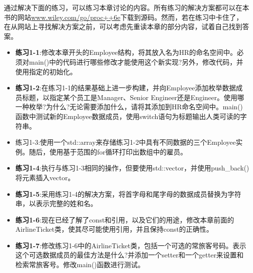 通过解决下面的练习，可以练习本章讨论的内容。所有练习的解决方案都可以在本书的网站\url{www.wiley.com/go/proc++6e}下载到源码。然而，若在练习中卡住了，在从网站上寻找解决方案之前，可以考虑先重读本章的部分内容，试着自己找到答案。

\begin{itemize}
\item
\textbf{练习1-1}:修改本章开头的Employee结构，将其放入名为HR的命名空间中。必须对main()中的代码进行哪些修改才能使用这个新实现?另外，修改代码，并使用指定的初始化。

\item
\textbf{练习1-2}:在练习1-1的结果基础上进一步构建，并向Employee添加枚举数据成员标题，以指定某个员工是Manager、Senior Engineer还是Engineer。使用哪一种枚举?为什么?无论需要添加什么，请将其添加到HR命名空间中。main()函数中测试新的Employee数据成员，使用switch语句为标题输出人类可读的字符串。

\item
练习1-3:使用一个std::array来存储练习1-2中具有不同数据的三个Employee实例。随后，使用基于范围的for循环打印出数组中的雇员。

\item
\textbf{练习1-4}:执行与练习1-3相同的操作，但要使用std::vector，并使用push\_back()将元素插入vector。

\item
\textbf{练习1-5}:采用练习1-4的解决方案，将首字母和尾字母的数据成员替换为字符串，以表示完整的姓和名。

\item
\textbf{练习1-6}:现在已经了解了const和引用，以及它们的用途，修改本章前面的AirlineTicket类，使其尽可能使用引用，并且保持const的正确性。

\item
\textbf{练习1-7}:修改练习1-6中的AirlineTicket类，包括一个可选的常旅客号码。表示这个可选数据成员的最佳方法是什么?并添加一个setter和一个getter来设置和检索常旅客号。修改main()函数进行测试。
\end{itemize}


